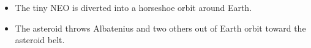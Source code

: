 \begin{itemize}
\item{The tiny NEO is diverted into a horseshoe orbit around Earth.}
\item{The asteroid throws Albatenius and two others out of Earth orbit toward the asteroid belt.}
\end{itemize}

\newpage
\thispagestyle{empty}